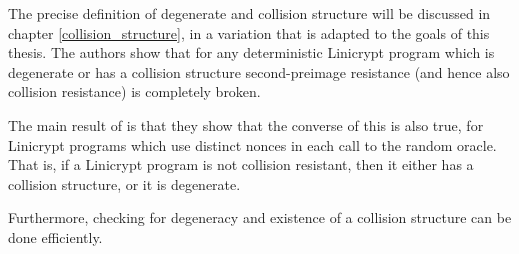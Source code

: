 The precise definition of degenerate and collision structure will be discussed in chapter \ref{collision_structure},
in a variation that is adapted to the goals of this thesis.
The authors show that for any deterministic Linicrypt program which is degenerate
or has a collision structure
second-preimage resistance (and hence also collision resistance) is completely broken.

The main result of \cite{C:CarRos16} is that they show that the converse of this is also true,
for Linicrypt programs which use distinct nonces in each call to the random oracle.
That is, if a Linicrypt program is not collision resistant,
then it either has a collision structure, or it is degenerate.

Furthermore, checking for degeneracy and existence of a collision structure can be done efficiently.
